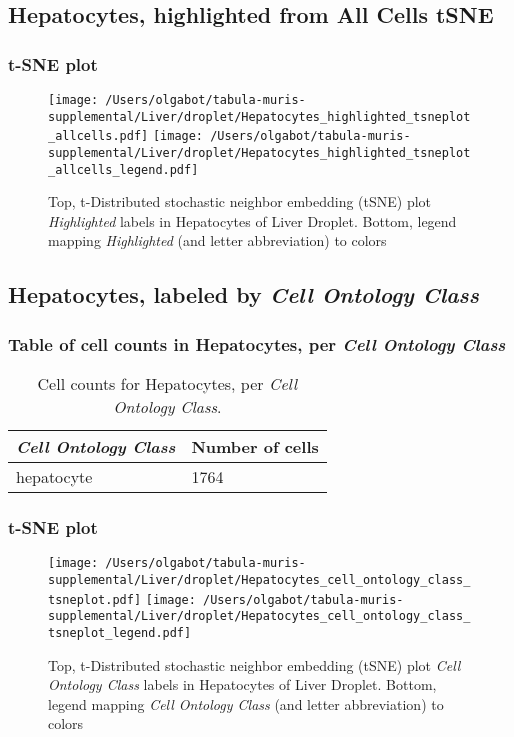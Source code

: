 \clearpage
\subsection{Hepatocytes, highlighted from All Cells tSNE}
\subsubsection{t-SNE plot}
\begin{figure}[h]
\centering
\texttt{[image: /Users/olgabot/tabula-muris-supplemental/Liver/droplet/Hepatocytes\_highlighted\_tsneplot\_allcells.pdf]}
\texttt{[image: /Users/olgabot/tabula-muris-supplemental/Liver/droplet/Hepatocytes\_highlighted\_tsneplot\_allcells\_legend.pdf]}
\caption{Top, t-Distributed stochastic neighbor embedding (tSNE) plot  \emph{Highlighted} labels in Hepatocytes of Liver Droplet. Bottom, legend mapping \emph{Highlighted} (and letter abbreviation) to colors}
\end{figure}


\clearpage

\subsection{Hepatocytes, labeled by \emph{Cell Ontology Class}}
\subsubsection{Table of cell counts in Hepatocytes, per \emph{Cell Ontology Class}}\begin{table}[h]
\centering
\label{my-label}
\begin{tabular}{@{}ll@{}}
\toprule

\emph{Cell Ontology Class}& Number of cells \\ \midrule
hepatocyte & 1764 \\
\bottomrule
\end{tabular}
\caption{Cell counts for Hepatocytes, per \emph{Cell Ontology Class}.}
\end{table}

\clearpage
\subsubsection{t-SNE plot}
\begin{figure}[h]
\centering
\texttt{[image: /Users/olgabot/tabula-muris-supplemental/Liver/droplet/Hepatocytes\_cell\_ontology\_class\_tsneplot.pdf]}
\texttt{[image: /Users/olgabot/tabula-muris-supplemental/Liver/droplet/Hepatocytes\_cell\_ontology\_class\_tsneplot\_legend.pdf]}
\caption{Top, t-Distributed stochastic neighbor embedding (tSNE) plot  \emph{Cell Ontology Class} labels in Hepatocytes of Liver Droplet. Bottom, legend mapping \emph{Cell Ontology Class} (and letter abbreviation) to colors}
\end{figure}


